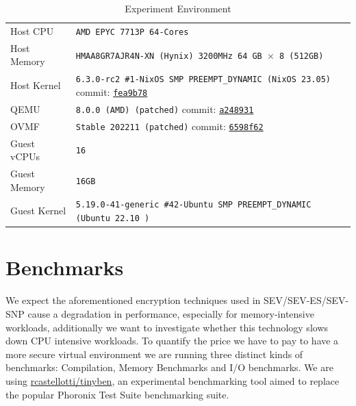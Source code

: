 \documentclass[twocolumn]{article}
\begin{document}
\begin{table}[ht]
    \small
    \centering
    \begin{tabular}{l|l}
        \hline
        Host CPU      & \texttt{AMD EPYC 7713P 64-Cores}                                            \\
        Host Memory   & \texttt{HMAA8GR7AJR4N-XN (Hynix) 3200MHz 64 GB $\times$ 8 (512GB)}          \\
        Host Kernel   & \texttt{6.3.0-rc2 \#1-NixOS SMP PREEMPT\_DYNAMIC (NixOS 23.05)} commit: \href{https://github.com/AMDESE/linux/tree/fea9b785bfa90e015c7d81526e36060da1bf01d1}{\texttt{fea9b78}}            \\
        QEMU          & \texttt{8.0.0 (AMD) (patched)} commit: \href{https://github.com/AMDESE/qemu/tree/a248931547843b9edb0f3b0c7d6d0c76ffdf7659}{\texttt{a248931}}                                             \\
        OVMF          & \texttt{Stable 202211 (patched)} commit: \href{https://github.com/AMDESE/ovmf/commit/6598f62bda4eb884c65d6c0aed7ede64258a41d8}{\texttt{6598f62}}                                     \\
        Guest vCPUs   & \texttt{16}                                                                 \\
        Guest Memory  & \texttt{16GB}                                                               \\
        Guest Kernel  & \texttt{5.19.0-41-generic \#42-Ubuntu SMP PREEMPT\_DYNAMIC (Ubuntu 22.10 )} \\ 
        \hline
    \end{tabular}
    \caption{Experiment Environment}
    \label{tab:experiment-environment}
\end{table}

\section{Benchmarks}
We expect the aforementioned encryption techniques used in SEV/SEV-ES/SEV-SNP cause a degradation in performance, especially for memory-intensive workloads, additionally we want to investigate whether this technology slows down CPU intensive workloads. To quantify the price we have to pay to have a more secure virtual environment we are running three distinct kinds of benchmarks: Compilation, Memory Benchmarks and I/O benchmarks. We are using \href{https://github.com/rcastellotti/tinyben}{rcastellotti/tinyben}, an experimental benchmarking tool aimed to replace the popular Phoronix Test Suite \cite{pts} benchmarking suite.
\end{document}
